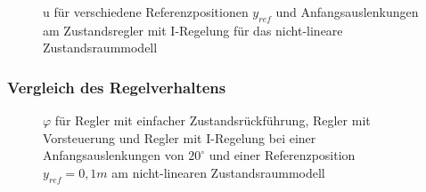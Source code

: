 \documentclass[
	pagesize,
	fontsize=12pt,
	paper=a4,
	oneside,
   reqno
]{scrartcl}
\begin{document}
\begin{figure}[H]
    \centering
    \caption[u für Regler mit I-Regelung (nicht-linear)]{u für verschiedene Referenzpositionen $y_{ref}$ und Anfangsauslenkungen am Zustandsregler mit I-Regelung für das nicht-lineare Zustandsraummodell}
    \label{fig:Bild29}
\end{figure}

\subsubsection{Vergleich des Regelverhaltens}

\begin{figure}[H]
    \centering
    \caption[Reglervergleich für $\varphi$ (nicht-linear)]{$\varphi$ für Regler mit einfacher Zustandsrückführung, Regler mit Vorsteuerung und Regler mit I-Regelung bei einer Anfangsauslenkungen von $20^\circ$ und einer Referenzposition $y_{ref} = 0,1 m$ am nicht-linearen Zustandsraummodell}
    \label{fig:Bild30}
\end{figure}
\end{document}

